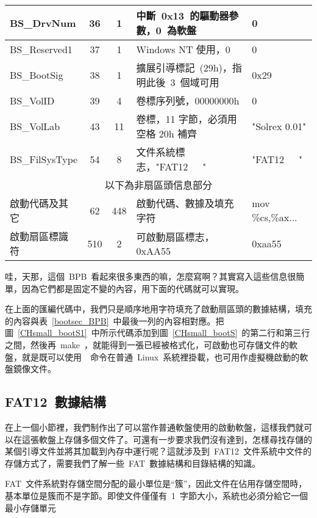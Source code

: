 {\begin{center}
\begin{longtable}{l|c|c|l|l}
\hline
BS\_DrvNum      & 36 &  1 & 中斷~0x13~的驅動器參數，0~為軟盤        & 0\\
\hline
BS\_Reserved1   & 37 &  1 & Windows NT 使用，0                      & 0\\
\hline
BS\_BootSig     & 38 &  1 & 擴展引導標記~(29h)，指明此後~3~個域可用 & 0x29\\
\hline
BS\_VolID       & 39 &  4 & 卷標序列號，00000000h                   & 0\\
\hline
BS\_VolLab      & 43 & 11 & 卷標，11 字節，必須用空格 20h 補齊      & "Solrex 0.01"\\
\hline
BS\_FilSysType  & 54 &  8 & 文件系統標志，"FAT12~~~"                & "FAT12~~~"\\
\hline
\multicolumn{5}{c}{以下為非扇區頭信息部分}\\
\hline
啟動代碼及其它  & 62 & 448 & 啟動代碼、數據及填充字符               & mov \%cs,\%ax...\\
\hline
啟動扇區標識符  & 510 &  2 & 可啟動扇區標志，0xAA55                 & 0xaa55\\
\hline
\end{longtable}\end{center}
}

哇，天那，這個~BPB~看起來很多東西的嘛，怎麼寫啊？其實寫入這些信息很簡單，因為它們都是固定不變的內容，用下面的代碼就可以實現。

\label{CHsmall_bootS1}

在上面的匯編代碼中，我們只是順序地用字符填充了啟動扇區頭的數據結構，填充的內容與表~\ref{bootsec_BPB}~中最後一列的內容相對應。把圖~\ref{CHsmall_bootS1}~中所示代碼添加到圖~\ref{CHsmall_bootS}~的第二行和第三行之間，然後再~make~，就能得到一張已經被格式化，可啟動也可存儲文件的軟盤，就是既可以使用~~命令在普通~Linux~系統裡掛載，也可用作虛擬機啟動的軟盤鏡像文件。

\subsection{FAT12~數據結構}

在上一個小節裡，我們制作出了可以當作普通軟盤使用的啟動軟盤，這樣我們就可以在這張軟盤上存儲多個文件了。可還有一步要求我們沒有達到，怎樣尋找存儲的某個引導文件並將其加載到內存中運行呢？這就涉及到~FAT12~文件系統中文件的存儲方式了，需要我們了解一些~FAT~數據結構和目錄結構的知識。

FAT~文件系統對存儲空間分配的最小單位是“簇”，因此文件在佔用存儲空間時，基本單位是簇而不是字節。即使文件僅僅有~1~字節大小，系統也必須分給它一個最小存儲單元
